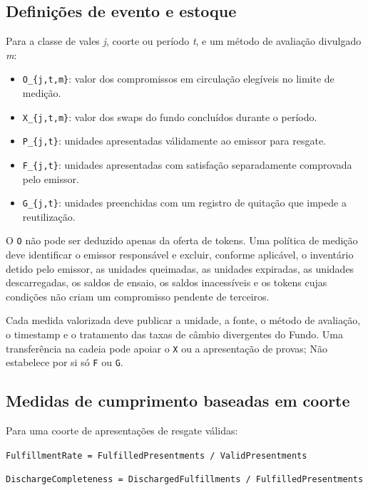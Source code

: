 \documentclass[11pt]{article}
\begin{document}
\subsection*{Definições de evento e estoque}

Para a classe de vales \emph{j}, coorte ou período \emph{t}, e um método de avaliação divulgado \emph{m}:

\begin{itemize}[leftmargin=*]
\item \texttt{O\_\{j,t,m\}}: valor dos compromissos em circulação elegíveis no limite de medição.
\item \texttt{X\_\{j,t,m\}}: valor dos swaps do fundo concluídos durante o período.
\item \texttt{P\_\{j,t\}}: unidades apresentadas válidamente ao emissor para resgate.
\item \texttt{F\_\{j,t\}}: unidades apresentadas com satisfação separadamente comprovada pelo emissor.
\item \texttt{G\_\{j,t\}}: unidades preenchidas com um registro de quitação que impede a reutilização.
\end{itemize}
O \texttt{O} não pode ser deduzido apenas da oferta de tokens. Uma política de medição deve identificar o emissor responsável e excluir, conforme aplicável, o inventário detido pelo emissor, as unidades queimadas, as unidades expiradas, as unidades descarregadas, os saldos de ensaio, os saldos inacessíveis e os tokens cujas condições não criam um compromisso pendente de terceiros.

Cada medida valorizada deve publicar a unidade, a fonte, o método de avaliação, o timestamp e o tratamento das taxas de câmbio divergentes do Fundo. Uma transferência na cadeia pode apoiar o \texttt{X} ou a apresentação de provas; Não estabelece por si só \texttt{F} ou \texttt{G}.

\subsection*{Medidas de cumprimento baseadas em coorte}

Para uma coorte de apresentações de resgate válidas:

\texttt{FulfillmentRate = FulfilledPresentments / ValidPresentments}

\texttt{DischargeCompleteness = DischargedFulfillments / FulfilledPresentments}
\end{document}
